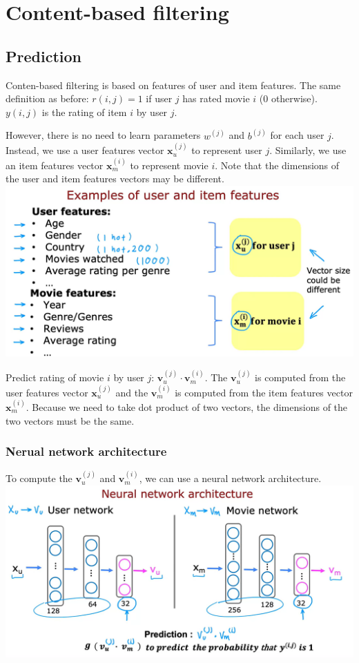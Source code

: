 \chapter{Content-based filtering}
\section{Prediction}
Conten-based filtering is based on features of user and item features. The same definition as before:
$r(i ,j) = 1$ if user $j$ has rated movie $i$ (0 otherwise). $y(i, j)$ is the rating of item $i$ by user $j$.

However, there is no need to learn parameters $w^{(j)}$ and $b^{(j)}$ for each user $j$. Instead, we use a user features
vector $\mathbf{x}_{u}^{(j)}$ to represent user $j$. Similarly, we use an item features vector $\mathbf{x}_{m}^{(i)}$ to represent movie $i$.
Note that the dimensions of the user and item features vectors may be different.\\
\includegraphics*[width=\textwidth]{images/16.1}

Predict rating of movie $i$ by user $j$: \colorbox{amzexboxcolor}{$\mathbf{v}_{u}^{(j)} \cdot \mathbf{v}_m^{(i)}$}.
The $\mathbf{v}_{u}^{(j)}$ is computed from the user features vector $\mathbf{x}_{u}^{(j)}$ 
and the $\mathbf{v}_m^{(i)}$ is computed from the item features vector $\mathbf{x}_{m}^{(i)}$.
Because we need to take dot product of two vectors, the dimensions of the two vectors must be the same.

\subsection*{Nerual network architecture}
To compute the $\mathbf{v}_{u}^{(j)}$ and $\mathbf{v}_m^{(i)}$, we can use a neural network architecture.\\
\includegraphics*[width=\textwidth]{images/16.2}

